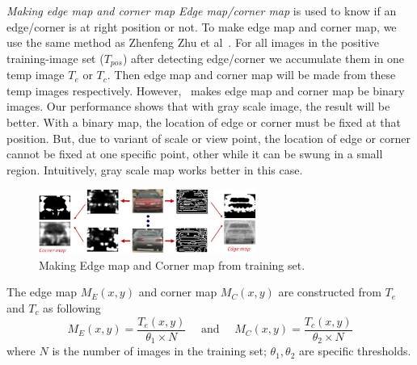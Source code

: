 \textit{Making edge map and corner map }
\textit{Edge map/corner map} is used to know if an edge/corner is at right
position or not. To make edge map and corner map, we use the same
method as Zhenfeng Zhu et al~\cite{zhu2004car}. For all images in the positive
training-image set ($T_{pos}$) 
after detecting edge/corner we accumulate them in one temp
image $T_{e}$ or $T_{c}$. Then edge map and corner map will be made from
these temp images respectively. However,~\cite{zhu2004car} makes edge map and
corner map be binary images. Our performance shows that with gray
scale image, the result will be better. With a binary map, the location
of edge or corner must be fixed at that position. But, due to variant
of scale or view point, the location of edge or corner cannot be fixed
at one specific point, other while it can be swung in a small region.
Intuitively, gray scale map works better in this case.
\begin{figure}[ht]
  \centering
  \includegraphics[width=2.8in]{images/edgemap_cornermap.jpg}
  \caption{Making Edge map and Corner map from training set.}
  \label{fig:making_edge_corner_map}
\end{figure}
The edge map $M_{E}(x,y)$ and corner map $M_{C}(x,y)$ are constructed from
$T_{e}$ and $T_{c}$ as following
\begin{equation}
M_E(x,y) = \frac{T_{e}(x,y)}{\theta_1 \times N} \mbox{~~~~and~~~~}
M_C(x,y) = \frac{T_{c}(x,y)}{\theta_2 \times N}
   \label{eq:edge_corner_map}
\end{equation}
where $N$ is the number of images in the training set; $\theta_1, \theta_2$ are
specific thresholds. %
